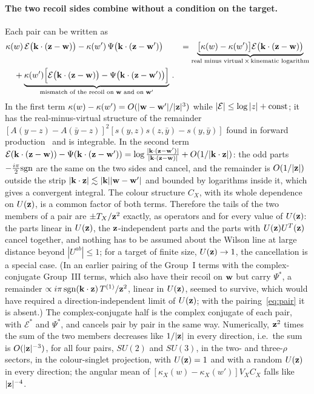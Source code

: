 \paragraph{The two recoil sides combine without a condition on the target.} Each pair can be written as
\begin{align}\label{eq:rmv}
&\kappa(w)\,\mathcal E\big(\mathbf{k}\cdot(\mathbf{z}-\mathbf{w})\big)-\kappa(w')\,\Psi\big(\mathbf{k}\cdot(\mathbf{z}-\mathbf{w}')\big)
&=\underbrace{\big[\kappa(w)-\kappa(w')\big]\mathcal E\big(\mathbf{k}\cdot(\mathbf{z}-\mathbf{w})\big)}_{\text{real minus virtual}\,\times\,\text{kinematic logarithm}}\notag\\&\quad
+\underbrace{\kappa(w')\Big[\mathcal E\big(\mathbf{k}\cdot(\mathbf{z}-\mathbf{w})\big)-\Psi\big(\mathbf{k}\cdot(\mathbf{z}-\mathbf{w}')\big)\Big]}_{\text{mismatch of the recoil on }\mathbf{w}\text{ and on }\mathbf{w}'}\,.
\end{align}
In the first term $\kappa(w)-\kappa(w')=O(|\mathbf{w}-\mathbf{w}'|/|\mathbf{z}|^3)$ while $|\mathcal E|\le\log|z|+{\rm const}$; it has the real-minus-virtual structure of the remainder $[A(y-z)-A(\bar y-z)]^2[s(y,z)s(z,\bar y)-s(y,\bar y)]$ found in forward production~\cite{Altinoluk:2014eka} and is integrable. In the second term $\mathcal E(\mathbf{k}\cdot(\mathbf{z}-\mathbf{w}))-\Psi(\mathbf{k}\cdot(\mathbf{z}-\mathbf{w}'))=\log\frac{|\mathbf{k}\cdot(\mathbf{z}-\mathbf{w}')|}{|\mathbf{k}\cdot(\mathbf{z}-\mathbf{w})|}+O(1/|\mathbf{k}\cdot\mathbf{z}|)$: the odd parts $-\frac{i\pi}{2}{\rm sgn}$ are the same on the two sides and cancel, and the remainder is $O(1/|\mathbf{z}|)$ outside the strip $|\mathbf{k}\cdot\mathbf{z}|\lesssim|\mathbf{k}||\mathbf{w}-\mathbf{w}'|$ and bounded by logarithms inside it, which gives a convergent integral. The colour structure $C_X$, with its whole dependence on $U(\mathbf{z})$, is a common factor of both terms. Therefore the tails of the two members of a pair are $\pm T_X/\mathbf{z}^2$ exactly, as operators and for every value of $U(\mathbf{z})$: the parts linear in $U(\mathbf{z})$, the $\mathbf{z}$-independent parts and the parts with $U(\mathbf{z})U^T(\mathbf{z})$ cancel together, and nothing has to be assumed about the Wilson line at large distance beyond $|U^{ab}|\le1$; for a target of finite size, $U(\mathbf{z})\to1$, the cancellation is a special case. (In an earlier pairing of the Group~I terms with the complex-conjugate Group~III terms, which also have their recoil on $\mathbf{w}$ but carry $\Psi^*$, a remainder $\propto i\pi\,{\rm sgn}(\mathbf{k}\cdot\mathbf{z})\,T^{(1)}/\mathbf{z}^2$, linear in $U(\mathbf{z})$, seemed to survive, which would have required a direction-independent limit of $U(\mathbf{z})$; with the pairing~\eqref{eq:pair} it is absent.) The complex-conjugate half is the complex conjugate of each pair, with $\mathcal E^*$ and $\Psi^*$, and cancels pair by pair in the same way. Numerically, $\mathbf{z}^2$ times the sum of the two members decreases like $1/|\mathbf{z}|$ in every direction, i.e.\ the sum is $O(|\mathbf{z}|^{-3})$, for all four pairs, $SU(2)$ and $SU(3)$, in the two- and three-$\rho$ sectors, in the colour-singlet projection, with $U(\mathbf{z})=1$ and with a random $U(\mathbf{z})$ in every direction; the angular mean of $[\kappa_X(w)-\kappa_X(w')]V_XC_X$ falls like $|\mathbf{z}|^{-4}$.

